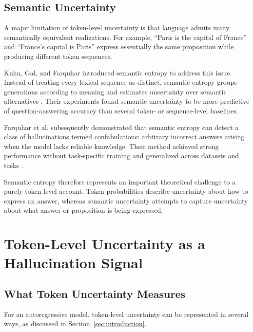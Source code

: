 \documentclass[11pt]{article}
\begin{document}
\subsection{Semantic Uncertainty}
\label{sec:semantic-uncertainty}

A major limitation of token-level uncertainty is that language admits many semantically equivalent realizations. For example, ``Paris is the capital of France'' and ``France's capital is Paris'' express essentially the same proposition while producing different token sequences.

Kuhn, Gal, and Farquhar introduced semantic entropy to address this issue. Instead of treating every lexical sequence as distinct, semantic entropy groups generations according to meaning and estimates uncertainty over semantic alternatives \cite{kuhn2023}. Their experiments found semantic uncertainty to be more predictive of question-answering accuracy than several token- or sequence-level baselines.

Farquhar et al. subsequently demonstrated that semantic entropy can detect a class of hallucinations termed confabulations: arbitrary incorrect answers arising when the model lacks reliable knowledge. Their method achieved strong performance without task-specific training and generalized across datasets and tasks \cite{farquhar2024}.

Semantic entropy therefore represents an important theoretical challenge to a purely token-level account. Token probabilities describe uncertainty about how to express an answer, whereas semantic uncertainty attempts to capture uncertainty about what answer or proposition is being expressed.

\section{Token-Level Uncertainty as a Hallucination Signal}
\label{sec:token-hallucination}

\subsection{What Token Uncertainty Measures}
\label{sec:token-measures}

For an autoregressive model, token-level uncertainty can be represented in several ways, as discussed in Section~\ref{sec:introduction}.
\end{document}
